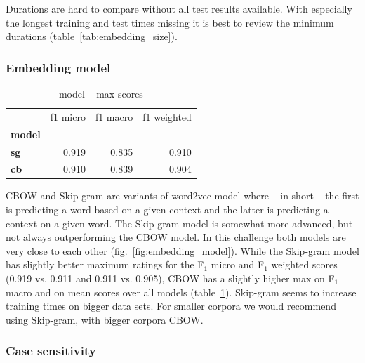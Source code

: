 \documentclass[11pt,a4paper]{article}
\begin{document}
Durations are hard to compare without all test results available. With especially the longest training and test times missing it is best to review the minimum durations (table~\ref{tab:embedding_size}).


\subsubsection{Embedding model}


\begin{table}[htbp]
	\caption{model -- max scores}
	\label{tab:embedding_model}
	\centering
	\begin{tabular}{lrrr}
	\toprule
		{} &  f1 micro &  f1 macro &  f1 weighted \\
		\textbf{model} &           &           & \\
		\midrule
		\textbf{sg    } &  0.919 &  0.835 &     0.910 \\
		\textbf{cb    } &  0.910 &  0.839 &     0.904 \\
		\bottomrule
	\end{tabular}
\end{table}

CBOW and Skip-gram are variants of word2vec model where -- in short -- the first is predicting a word based on a given context and the latter is predicting a context on a given word. The Skip-gram model is somewhat more advanced, but not always outperforming the CBOW model. In this challenge both models are very close to each other (fig.~\ref{fig:embedding_model}). While the Skip-gram model has slightly better maximum ratings for the F$_1$ micro and F$_1$ weighted scores (0.919 vs. 0.911 and 0.911 vs. 0.905), CBOW has a slightly higher max on F$_1$ macro and on mean scores over all models (table~\ref{tab:embedding_model}). Skip-gram seems to increase training times on bigger data sets. For smaller corpora we would recommend using Skip-gram, with bigger corpora CBOW.

\subsubsection{Case sensitivity}
\end{document}
